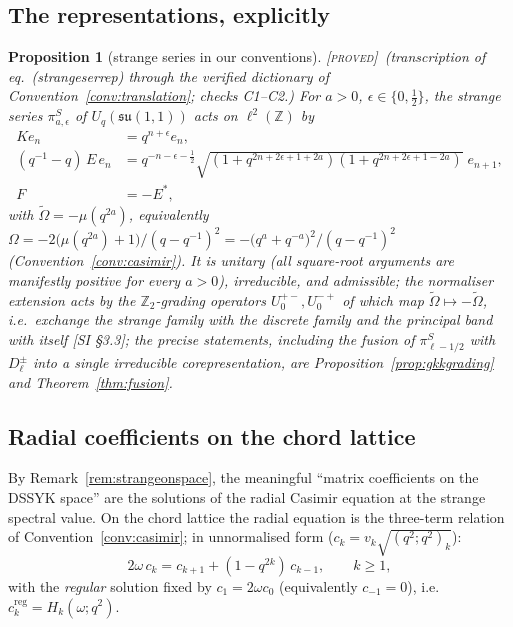 \documentclass[11pt,a4paper]{article}
\newcommand{\PROVED}{{\color{ForestGreen}\textsc{[proved]}}}
\theoremstyle{definition}
\theoremstyle{plain}
\newtheorem{proposition}[definition]{Proposition}
\newcommand{\Uq}{U_q(\mathfrak{su}(1,1))}
\newcommand{\Cas}{\Omega}                       %
\newcommand{\tCas}{\tilde\Omega}                %
\newcommand{\Z}{\mathbb{Z}}
\begin{document}
\subsection{The representations, explicitly}

\begin{proposition}[strange series in our conventions]\label{prop:strangeexplicit}
\PROVED\ (transcription of \cite{Groenevelt:2009gkk} eq.\ (strangeserrep) through the verified
dictionary of Convention~\ref{conv:translation}; checks C1--C2.) For $a>0$,
$\epsilon\in\{0,\tfrac12\}$, the strange series $\pi^{S}_{a,\epsilon}$ of $\Uq$ acts on
$\ell^{2}(\Z)$ by
\begin{equation}\label{eq:strangeexplicitSI}
\begin{split}
  K e_{n}&=q^{n+\epsilon}e_{n},\\
  (q^{-1}-q)\,E\,e_{n}
  &=q^{-n-\epsilon-\frac12}\sqrt{(1+q^{2n+2\epsilon+1+2a})(1+q^{2n+2\epsilon+1-2a})}\;e_{n+1},\\
  F&=-E^{*},
\end{split}
\end{equation}
with $\tCas=-\mu(q^{2a})$, equivalently
$\Cas=-2\bigl(\mu(q^{2a})+1\bigr)/(q-q^{-1})^{2}=-\bigl(q^{a}+q^{-a}\bigr)^{2}/(q-q^{-1})^{2}$
(Convention~\ref{conv:casimir}). It is unitary (all square-root arguments are manifestly positive for every $a>0$), irreducible,
and admissible; the normaliser extension acts by the $\Z_2$-grading operators
$U^{+-}_{0},U^{-+}_{0}$ of \cite{Groenevelt:2009gkk} which map $\tCas\mapsto-\tCas$, i.e.\
exchange the strange family with the discrete family and the principal band with itself
[SI \S3.3]; the precise statements, including the fusion of $\pi^{S}_{\ell-1/2}$ with
$D^{\pm}_{\ell}$ into a single irreducible corepresentation, are
Proposition~\ref{prop:gkkgrading} and Theorem~\ref{thm:fusion}.
\end{proposition}

\subsection{Radial coefficients on the chord lattice}

By Remark~\ref{rem:strangeonspace}, the meaningful ``matrix coefficients on the DSSYK space''
are the solutions of the radial Casimir equation at the strange spectral value. On the chord
lattice the radial equation is the three-term relation of Convention~\ref{conv:casimir}; in
unnormalised form ($c_{k}=v_{k}\sqrt{(q^{2};q^{2})_{k}}$):
\begin{equation}\label{eq:radialrecurrence}
  2\omega\,c_{k}=c_{k+1}+(1-q^{2k})\,c_{k-1},\qquad k\ge1,
  \tag{R}
\end{equation}
with the \emph{regular} solution fixed by $c_{1}=2\omega c_{0}$ (equivalently $c_{-1}=0$), i.e.\
$c^{\mathrm{reg}}_{k}=H_{k}(\omega;q^{2})$.
\end{document}
